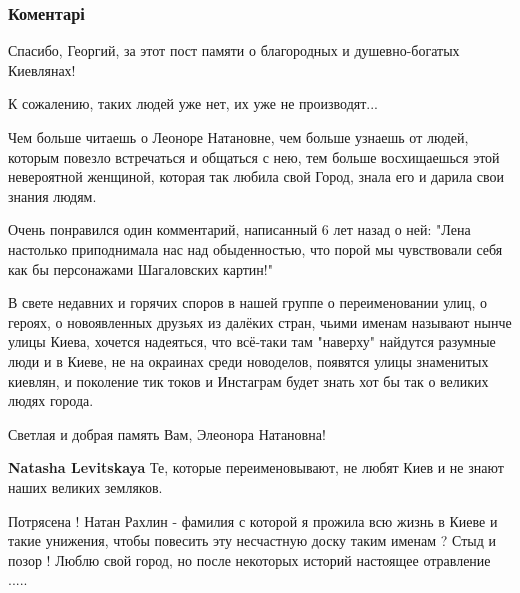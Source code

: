  
 
 
 
 
\subsubsection{Коментарі}

\begin{itemize} %

Спасибо, Георгий, за этот пост памяти о благородных и душевно-богатых
Киевлянах!

К сожалению, таких людей уже нет, их уже не производят...

Чем больше читаешь о Леоноре Натановне, чем больше узнаешь от людей, которым
повезло встречаться и общаться с нею, тем больше восхищаешься этой невероятной
женщиной, которая так любила свой Город, знала его и дарила свои знания людям.

Очень понравился один комментарий, написанный 6 лет назад о ней: "Лена
настолько приподнимала нас над обыденностью, что порой мы чувствовали себя как
бы персонажами Шагаловских картин!"

В свете недавних и горячих споров в нашей группе о переименовании улиц, о
героях, о новоявленных друзьях из далёких стран, чьими именам называют нынче
улицы Киева, хочется надеяться, что всё-таки там "наверху" найдутся разумные
люди и в Киеве, не на окраинах среди новоделов, появятся улицы знаменитых
киевлян, и поколение тик токов и Инстаграм будет знать хот бы так о великих
людях города.

Светлая и добрая память Вам, Элеонора Натановна!

\begin{itemize} %
\textbf{Natasha Levitskaya} Те, которые переименовывают, не любят Киев и не знают наших великих земляков.
\end{itemize} %


Потрясена ! Натан Рахлин - фамилия с которой я прожила всю жизнь в Киеве и
такие унижения, чтобы повесить эту несчастную доску таким именам ? Стыд и позор
! Люблю свой город, но после некоторых историй настоящее отравление .....



\end{itemize}
